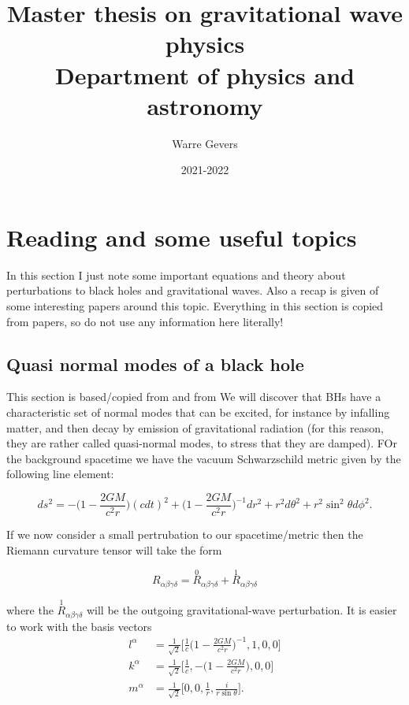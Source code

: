 \documentclass[12 pt]{article}
\title{Master thesis on gravitational wave physics\\
	\large Department of physics and astronomy}
\author{Warre Gevers}
\date{2021-2022}
\begin{document}
	
	\maketitle
	\section{Reading and some useful topics}
	In this section I just note some important equations and theory about perturbations to black holes and gravitational waves. Also a recap is given of some interesting papers around this topic. Everything in this section is copied from papers, so do not use any information here literally!
	\subsection{Quasi normal modes of a black hole}
	This section is based/copied from \cite{creighton} and from \cite{maggiore}
	We will discover that BHs have a characteristic set of normal modes that can be excited, for instance by infalling matter, and then decay by emission of gravitational radiation (for this reason, they are rather called quasi-normal modes, to stress that they are damped).
	FOr the background spacetime we have the vacuum Schwarzschild metric given by the following line element:
	
	\begin{equation}
		ds^2 = - \big(1-\frac{2GM}{c^2r} \big) (cdt)^2 + \big(1-\frac{2GM}{c^2r} \big)^{-1} dr^2 + r^2 d\theta^2 + r^2 \sin^2 \theta d \phi^2 .
	\end{equation}
	
	If we now consider a small pertrubation to our spacetime/metric then the Riemann curvature tensor will take the form
	
	\begin{equation*}
		R_{\alpha \beta \gamma \delta} = \stackrel{0}{R}_{\alpha \beta \gamma \delta} + \stackrel{1}{R}_{\alpha \beta \gamma \delta}
	\end{equation*}
	
	where the $\stackrel{1}{R}_{\alpha \beta \gamma \delta}$ will be the outgoing gravitational-wave perturbation. It is easier to work with the basis vectors 
	\begin{align}
		l^{\alpha} &= \frac{1}{\sqrt{2}}\big[ \frac{1}{c}\big(1-\frac{2GM}{c^2r}\big)^{-1},1,0,0 \big] \\
		k^{\alpha} &= \frac{1}{\sqrt{2}}\big[ \frac{1}{c}, -\big(1-\frac{2GM}{c^2r}\big),0,0 \big] \\
		m^{\alpha} &=  \frac{1}{\sqrt{2}}\big[ 0, 0,\frac{1}{r},\frac{i}{r \sin \theta} \big].
	\end{align}
	
\end{document}
